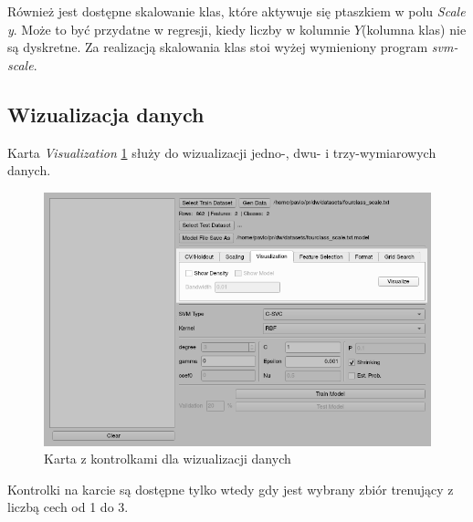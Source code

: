 \documentclass[paper=a4, fontsize=11pt]{scrartcl} %
\numberwithin{equation}{section} %
\numberwithin{figure}{section} %
\begin{document}
    \par Również jest dostępne skalowanie klas, które aktywuje się ptaszkiem w polu
    \textit{Scale y}. Może to być przydatne w regresji, kiedy liczby w kolumnie $Y$(kolumna
    klas) nie są dyskretne. Za realizacją skalowania klas stoi wyżej wymieniony program
    \textit{svm-scale}.

\newpage
\subsection{Wizualizacja danych}
    \par Karta \textit{Visualization} \ref{fig:visualization} służy do wizualizacji jedno-,
    dwu- i trzy-wymiarowych danych. 

    \begin{figure}[H]
        \begin{center}
            \includegraphics[scale=0.65]{./img/svm_app_visualization.png}
            \caption{Karta z kontrolkami dla wizualizacji danych}
            \label{fig:visualization}
        \end{center}
    \end{figure}

    \par Kontrolki na karcie są dostępne tylko wtedy gdy jest wybrany zbiór trenujący z liczbą
    cech od 1 do 3. 
\end{document}

